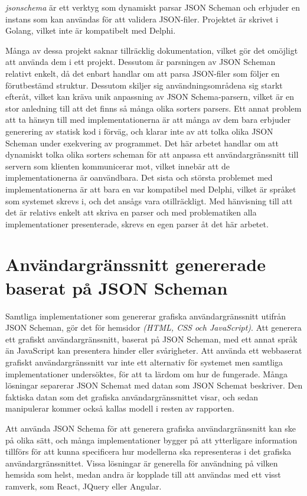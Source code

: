 \textit{jsonschema} är ett verktyg som dynamiskt parsar JSON Scheman och erbjuder en instans som kan användas för att validera JSON-filer. Projektet är skrivet i Golang, vilket inte är kompatibelt med Delphi. \cite{Qriinc.}

Många av dessa projekt saknar tillräcklig dokumentation, vilket gör det omöjligt att använda dem i ett projekt. Dessutom är parsningen av JSON Scheman relativt enkelt, då det enbart handlar om att parsa JSON-filer som följer en förutbestämd struktur. Dessutom skiljer sig användningsområdena sig starkt efteråt, vilket kan kräva unik anpassning av JSON Schema-parsern, vilket är en stor anledning till att det finns så många olika sorters parsers. Ett annat problem att ta hänsyn till med implementationerna är att många av dem bara erbjuder generering av statisk kod i förväg, och klarar inte av att tolka olika JSON Scheman under exekvering av programmet. Det här arbetet handlar om att dynamiskt tolka olika sorters scheman för att anpassa ett användargränssnitt till servern som klienten kommunicerar mot, vilket innebär att de implementationerna är oanvändbara. Det sista och största problemet med implementationerna är att bara en var kompatibel med Delphi, vilket är språket som systemet skrevs i, och det ansågs vara otillräckligt. Med hänvisning till att det är relativs enkelt att skriva en parser och med problematiken alla implementationer presenterade, skrevs en egen parser åt det här arbetet.

\section{Användargränssnitt genererade baserat på JSON Scheman}
\label{sec:forarbete:gui-generering}
Samtliga implementationer som genererar grafiska användargränssnitt utifrån JSON Scheman, gör det för hemsidor \textit{(HTML, CSS och JavaScript)}. Att generera ett grafiskt användargränssnitt, baserat på JSON Scheman, med ett annat språk än JavaScript kan presentera hinder eller svårigheter. Att använda ett webbaserat grafiskt användargränssnitt var inte ett alternativ för systemet men samtliga implementationer undersöktes, för att ta lärdom om hur de fungerade. Många lösningar separerar JSON Schemat med datan som JSON Schemat beskriver. Den faktiska datan som det grafiska användargränssnittet visar, och sedan manipulerar kommer också kallas modell i resten av rapporten.

Att använda JSON Schema för att generera grafiska användargränssnitt kan ske på olika sätt, och många implementationer bygger på att ytterligare information tillförs för att kunna specificera hur modellerna ska representeras i det grafiska användargränssnittet. Vissa lösningar är generella för användning på vilken hemsida som helst, medan andra är kopplade till att användas med ett visst ramverk, som React, JQuery eller Angular.

